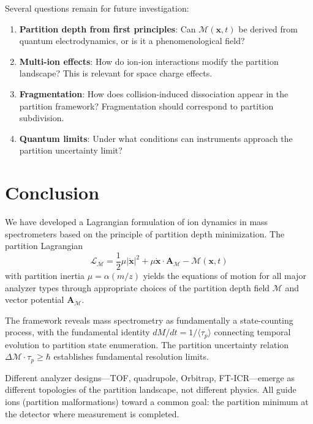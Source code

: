 \documentclass[twocolumn,10pt,a4paper]{article}
\theoremstyle{definition}
\theoremstyle{remark}
\newcommand{\Mdepth}{\mathcal{M}}
\newcommand{\Lagr}{\mathcal{L}}
\newcommand{\Apartition}{\mathbf{A}_{\mathcal{M}}}
\newcommand{\partinert}{\mu}
\newcommand{\taup}{\tau_p}
\begin{document}
Several questions remain for future investigation:

\begin{enumerate}
    \item \textbf{Partition depth from first principles}: Can $\Mdepth(\mathbf{x}, t)$ be derived from quantum electrodynamics, or is it a phenomenological field?

    \item \textbf{Multi-ion effects}: How do ion-ion interactions modify the partition landscape? This is relevant for space charge effects.

    \item \textbf{Fragmentation}: How does collision-induced dissociation appear in the partition framework? Fragmentation should correspond to partition subdivision.

    \item \textbf{Quantum limits}: Under what conditions can instruments approach the partition uncertainty limit?
\end{enumerate}

\section{Conclusion}
\label{sec:conclusion}

We have developed a Lagrangian formulation of ion dynamics in mass spectrometers based on the principle of partition depth minimization. The partition Lagrangian
\begin{equation*}
    \Lagr_{\Mdepth} = \frac{1}{2}\partinert|\dot{\mathbf{x}}|^2 + \partinert\dot{\mathbf{x}}\cdot\Apartition - \Mdepth(\mathbf{x}, t)
\end{equation*}
with partition inertia $\partinert = \alpha(m/z)$ yields the equations of motion for all major analyzer types through appropriate choices of the partition depth field $\Mdepth$ and vector potential $\Apartition$.

The framework reveals mass spectrometry as fundamentally a state-counting process, with the fundamental identity $dM/dt = 1/\langle\taup\rangle$ connecting temporal evolution to partition state enumeration. The partition uncertainty relation $\Delta\Mdepth \cdot \taup \geq \hbar$ establishes fundamental resolution limits.

Different analyzer designs---TOF, quadrupole, Orbitrap, FT-ICR---emerge as different topologies of the partition landscape, not different physics. All guide ions (partition malformations) toward a common goal: the partition minimum at the detector where measurement is completed.
\end{document}
